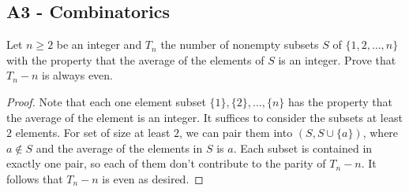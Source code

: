\documentclass[11pt]{scrartcl}
\newcommand{\<}{\langle}
\renewcommand{\>}{\rangle}
\begin{document}
\subsection{A3 - Combinatorics}
Let $n \ge 2$ be an integer and $T_n$ the number of nonempty subsets $S$ of $\{1, 2, \dots, n\}$ with the property that the average of the elements of $S$ is an integer.  Prove that $T_n - n$ is always even.  
\begin{proof}
Note that each one element subset $\{1\}, \{2\}, \dots, \{n\}$ has the property that the average of the element is an integer.  It suffices to consider the subsets at least $2$ elements.  For set of size at least $2$, we can pair them into $(S, S \cup\{a\})$, where $a \not \in S$ and the average of the elements in $S$ is $a$.  Each subset is contained in exactly one pair, so each of them don't contribute to the parity of $T_n - n$.  It follows that $T_n - n$ is even as desired.  
\end{proof}
\end{document}
